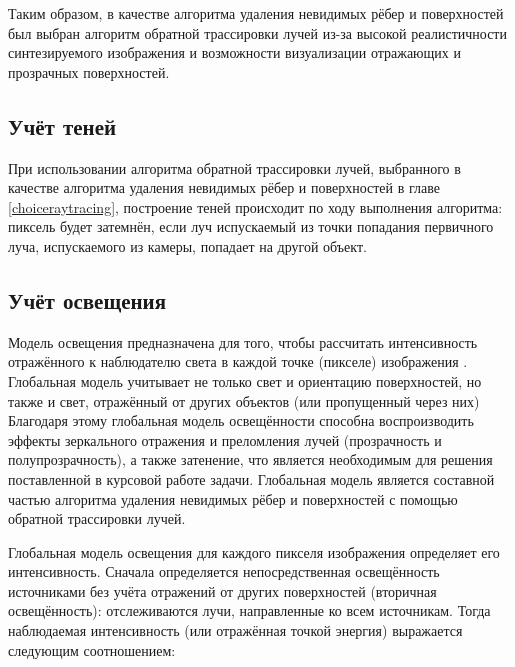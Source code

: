 Таким образом, в качестве алгоритма удаления невидимых рёбер и поверхностей был выбран алгоритм обратной трассировки лучей из-за высокой реалистичности синтезируемого изображения и возможности визуализации отражающих и прозрачных поверхностей. 

\subsection{Учёт теней}

При использовании алгоритма обратной трассировки лучей, выбранного в качестве алгоритма удаления невидимых рёбер и поверхностей в главе \ref{choiceraytracing}, построение теней происходит по ходу выполнения алгоритма: пиксель будет затемнён, если луч испускаемый из точки попадания первичного луча, испускаемого из камеры, попадает на другой объект.

\subsection{Учёт освещения}

Модель освещения предназначена для того, чтобы рассчитать интенсивность отражённого к наблюдателю света в каждой точке (пикселе) изображения \cite{rodgers}.  Глобальная модель учитывает не только свет и ориентацию поверхностей, но также и свет, отражённый от других объектов (или пропущенный через них) Благодаря этому глобальная модель освещённости способна воспроизводить эффекты зеркального отражения и преломления лучей (прозрачность и полупрозрачность), а также затенение, что является необходимым для решения поставленной в курсовой работе задачи. Глобальная модель является составной частью алгоритма удаления невидимых рёбер и поверхностей с помощью обратной трассировки лучей.

Глобальная модель освещения для каждого пикселя изображения определяет его интенсивность. Сначала определяется непосредственная освещённость источниками без учёта отражений от других поверхностей (вторичная освещённость): отслеживаются лучи, направленные ко всем источникам. Тогда наблюдаемая интенсивность (или отражённая точкой энергия) выражается следующим соотношением:

